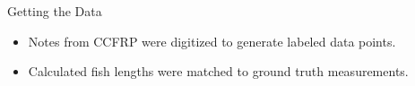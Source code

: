 




\begin{frame}{Getting the Data}
    \begin{itemize}
        \item Notes from CCFRP were digitized to generate labeled data points.
        \item Calculated fish lengths were matched to ground truth measurements.
    \end{itemize}
\end{frame}

